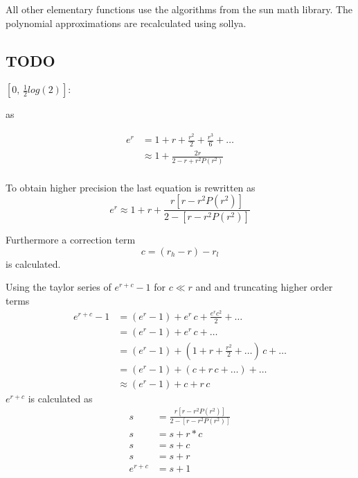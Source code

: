 \documentclass[10pt,a4paper,draft]{article}
\numberwithin{equation}{subsection}
\begin{document}
    All other elementary functions use the algorithms from the sun
    math library. The polynomial approximations are recalculated
    using sollya.

\subsection{TODO}
    $[0,\,\frac{1}{2}log(2)]$:

    as

    \begin{equation}
        \begin{aligned}
            e^{r} &= 1 + r + \frac{r^2}{2} + \frac{r^3}{6} + \dots \\
                  &\approx  1 + \frac {2r} {2 -r + r^2 P(r^2)} \\
        \end{aligned}
    \end{equation}

    To obtain higher precision the last equation is rewritten as
    \begin{equation}
        e^{r} \approx  1 + r + \frac{r [r -r^2 P(r^2)]} {2-[r-r^2P(r^2)]}
    \end{equation}

    Furthermore a correction term
    \[
        c = (r_h - r) - r_l
    \]
    is calculated.

    Using the taylor series of $e^{r+c}-1$ for $c \ll r$ and and truncating
    higher order terms
    \begin{equation}
        \label{equ:expm1-taylor}
        \begin{aligned}
            e^{r+c}-1 &= (e^r-1) + e^r\,c  + \frac{e^r c^2}{2} + \dots \\
                      &= (e^r-1) + e^r\,c  + \dots \\
                      &= (e^r-1) + (1+r+\frac{r^2}{2}+\dots)\,c + \dots \\
                      &= (e^r-1) + (c + r\,c + \dots) + \dots \\
                      &\approx (e^r-1) + c + r\,c
        \end{aligned}
    \end{equation}
    $e^{r+c}$ is calculated as
    \begin{equation}
        \begin{aligned}
            s &= \frac{r [r -r^2 P(r^2)]} {2-[r-r^2P(r^2)]} \\
            s &= s + r*c \\
            s &= s + c \\
            s &= s + r \\
            e^{r+c} &= s + 1
        \end{aligned}
    \end{equation}
\end{document}

